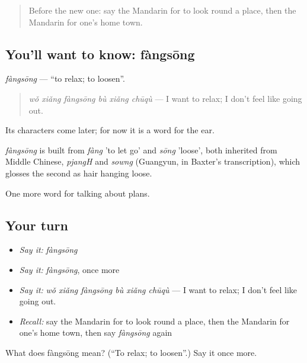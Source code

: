 \label{lesson:ZH-C184-fangsong}



\begin{quote}
Before the new one: say the Mandarin for to look round a place, then the Mandarin for one's home town.
\end{quote}

\subsection*{You'll want to know: fàngsōng}
\emph{fàngsōng} — \textquotedblleft{}to relax; to loosen\textquotedblright{}.

\begin{quote}
\emph{wǒ xiǎng fàngsōng bù xiǎng chūqù} — I want to relax; I don't feel like going out.
\end{quote}

Its characters come later; for now it is a word for the ear.

\begin{cousinweb}
\emph{fàngsōng} is built from \emph{fàng} 'to let go' and \emph{sōng} 'loose', both inherited from Middle Chinese, \emph{pjangH} and \emph{sowng} (Guangyun, in Baxter's transcription), which glosses the second as hair hanging loose.
\end{cousinweb}

\begin{grammarlens}[title={What you've built}]
One more word for talking about plans.
\end{grammarlens}

\subsection*{Your turn}
\begin{itemize}
\raggedright
  \item \emph{Say it:} \emph{fàngsōng}
  \item \emph{Say it:} \emph{fàngsōng}, once more
  \item \emph{Say it:} \emph{wǒ xiǎng fàngsōng bù xiǎng chūqù} — I want to relax; I don't feel like going out.
  \item \emph{Recall:} say the Mandarin for to look round a place, then the Mandarin for one's home town, then say \emph{fàngsōng} again
\end{itemize}

\begin{tcolorbox}[breakable,colback=teal!4,colframe=teal!35!black,title={Before you move on}]
What does fàngsōng mean? (\textquotedblleft{}To relax; to loosen\textquotedblright{}.) Say it once more.
\end{tcolorbox}
